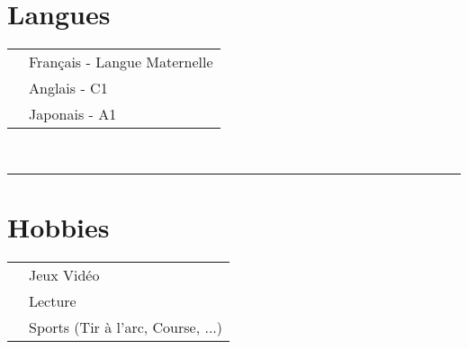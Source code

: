 \documentclass[oneside]{article}
\begin{document}
{\begin{minipage}[t][\textheight-2\fboxsep-2\fboxrule][t]{\dimexpr0.40\textwidth-2\fboxrule-2\fboxsep\relax}
        \section*{\large Langues}
        \begin{tabularx}{\textwidth}{cY}
            \faLanguage{} & Français - Langue Maternelle \\
            \faLanguage{} & Anglais - C1 \\
            \faLanguage{} & Japonais - A1 \\
        \end{tabularx}
        \vspace{.3cm}
        \\
        
        \rule{\linewidth}{0.4pt}
        \section*{\large Hobbies}
        \begin{tabularx}{\textwidth}{cY}
            \faGamepad{} & Jeux Vidéo \\
            \faBookReader{} & Lecture \\
            \faWalking{} & Sports (Tir à l'arc, Course, ...) \\
        \end{tabularx}
        \vspace{.3cm}
        
        \vfill
        
        
    \end{minipage}
}
\hfill
\end{document}
